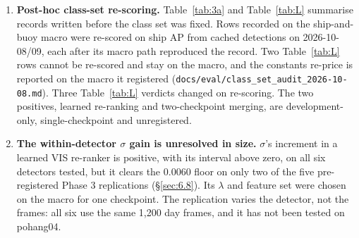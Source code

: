 \documentclass[10pt]{article}
\begin{document}
\begin{enumerate}
\item \textbf{Post-hoc class-set re-scoring.} Table~\ref{tab:3a} and Table~\ref{tab:L} summarise records written before the class set was fixed. Rows recorded on the ship-and-buoy macro were re-scored on ship AP from cached detections on 2026-10-08/09, each after its macro path reproduced the record. Two Table~\ref{tab:L} rows cannot be re-scored and stay on the macro, and the constants re-price is reported on the macro it registered (\texttt{docs/\allowbreak{}eval/\allowbreak{}class\_\allowbreak{}set\_\allowbreak{}audit\_\allowbreak{}2026-10-08.md}). Three Table~\ref{tab:L} verdicts changed on re-scoring. The two positives, learned re-ranking and two-checkpoint merging, are development-only, single-checkpoint and unregistered.
\item \textbf{The within-detector $\sigma$ gain is unresolved in size.} $\sigma$'s increment in a learned VIS re-ranker is positive, with its interval above zero, on all six detectors tested, but it clears the 0.0060 floor on only two of the five pre-registered Phase 3 replications (\S\ref{sec:6.8}). Its $\lambda$ and feature set were chosen on the macro for one checkpoint. The replication varies the detector, not the frames: all six use the same 1,200 day frames, and it has not been tested on pohang04.
\end{enumerate}
\end{document}
